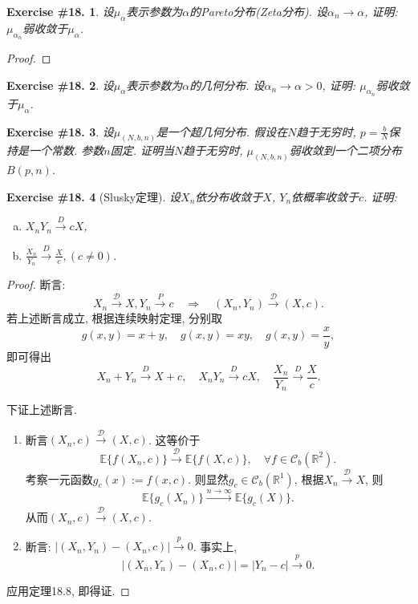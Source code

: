\documentclass[UTF8, a4paper]{article}
\newtheorem{exercise}{Exercise \#18.}
\begin{document}
\begin{framed}
\begin{exercise}
设\(\mu_\alpha\)表示参数为\(\alpha\)的Pareto分布(Zeta分布). 设\(\alpha_n \to \alpha\), 证明: \(\mu_{\alpha_n}\)弱收敛于\(\mu_{\alpha}\).
\end{exercise}
\end{framed}

\begin{proof}

\end{proof}
\begin{exercise}
设\(\mu_\alpha\)表示参数为\(\alpha\)的几何分布. 设\(\alpha_n \to \alpha > 0\), 证明: \(\mu_{\alpha_n}\)弱收敛于\(\mu_{\alpha}\).
\end{exercise}


\begin{exercise}
设\(\mu_{(N,b,n)}\)是一个超几何分布. 假设在\(N\)趋于无穷时, \(p = \frac{b}{N}\)保持是一个常数.
参数\(n\)固定. 证明当\(N\)趋于无穷时, \(\mu_{(N,b,n)}\)弱收敛到一个二项分布\(B(p,n)\).
\end{exercise}
 


\begin{framed}
\begin{exercise}[Slusky定理]
设\(X_n\)依分布收敛于\(X\), \(Y_n\)依概率收敛于\(c\). 证明: 
\begin{enumerate}[(a)]
\item \(X_nY_n \xrightarrow{D} cX\),
\item \(\frac{X_n}{Y_n} \xrightarrow{D} \frac{X}{c}, (c \neq 0)\).
\end{enumerate}
\end{exercise}
\end{framed}


\begin{proof}
断言:
$$
X_n \xrightarrow{\mathcal{D}} X, Y_n \xrightarrow{P} c \quad \Rightarrow \quad (X_n, Y_n) \xrightarrow{\mathcal{D}} (X, c).
$$
若上述断言成立, 根据连续映射定理, 分别取
$$
g(x,y) = x + y, \quad g(x,y) = xy, \quad g(x,y) = \frac{x}{y},
$$
即可得出
$$
X_n + Y_n \xrightarrow{D} X + c, \quad X_nY_n \xrightarrow{D} cX, \quad \frac{X_n}{Y_n} \xrightarrow{D} \frac{X}{c}.
$$

下证上述断言.
\begin{enumerate}[Step 1]
    \item 断言\((X_n, c) \xrightarrow{\mathcal{D}} (X,c)\). 这等价于$$
    \mathbb{E}\{f(X_n, c)\} \xrightarrow{\mathcal{D}} \mathbb{E}\{f(X, c)\}, \quad \forall f \in \mathscr{C}_b(\mathbb{R}^2).
    $$
    考察一元函数\(g_c(x) := f(x, c)\). 则显然\(g_c \in \mathscr{C}_b(\mathbb{R}^1)\), 根据\(X_n \xrightarrow{\mathcal{D}} X\), 则
    $$
    \mathbb{E}\{g_c(X_n)\} \xrightarrow{n\to\infty} \mathbb{E}\{g_c(X)\}.
    $$
    从而\((X_n, c) \xrightarrow{\mathcal{D}} (X,c)\).
    \item 断言: \(|(X_n, Y_n) - (X_n, c)| \xrightarrow{p} 0\). 事实上, $$
    |(X_n, Y_n) - (X_n, c)| = |Y_n - c| \xrightarrow{p} 0.
    $$
\end{enumerate}
应用定理18.8, 即得证.
\end{proof}
\end{document}
